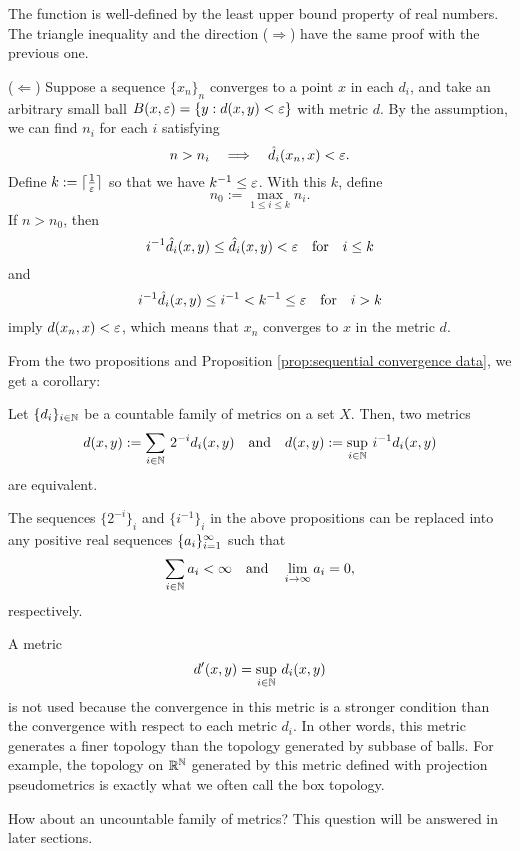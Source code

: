 \begin{pf}
The function is well-defined by the least upper bound property of real numbers.
The triangle inequality and the direction ($\Rightarrow$) have the same proof with the previous one.

($\Leftarrow$)
Suppose a sequence $\{x_n\}_n$ converges to a point $x$ in each $d_i$, and take an arbitrary small ball $B(x,\varepsilon)=\{y:d(x,y)<\varepsilon\}$ with metric $d$.
By the assumption, we can find $n_i$ for each $i$ satisfying
\[n>n_i\impl\hat d_i(x_n,x)<\e.\]
Define $k:=\lceil\frac1{\varepsilon}\rceil$ so that we have $k^{-1}\le\varepsilon$.
With this $k$, define
\[n_0:=\max_{1\le i\le k}n_i.\]
If $n>n_0$, then
\[i^{-1}\hat d_i(x,y)\le\hat d_i(x,y)<\varepsilon\quad\text{for}\quad i\le k\]
and
\[i^{-1}\hat d_i(x,y)\le i^{-1}<k^{-1}\le\varepsilon\quad\text{for}\quad i>k\]
imply $d(x_n,x)<\varepsilon$, which means that $x_n$ converges to $x$ in the metric $d$.
\end{pf}

From the two propositions and Proposition \ref{prop:sequential convergence data}, we get a corollary:
\begin{cor}
Let $\{d_i\}_{i\in\mathbb{N}}$ be a countable family of metrics on a set $X$.
Then, two metrics
\[d(x,y):=\sum_{i\in\mathbb{N}}\,2^{-i}d_i(x,y)\quad\text{and}\quad d(x,y):=\sup_{i\in\mathbb{N}}\,i^{-1}d_i(x,y)\]
are equivalent.
\end{cor}

The sequences $\{2^{-i}\}_i$ and $\{i^{-1}\}_i$ in the above propositions can be replaced into any positive real sequences $\{a_i\}_{i=1}^\infty$ such that
\[\sum_{i\in\N}a_i<\oo\quad\text{and}\quad\lim_{i\to\oo}a_i=0,\]
respectively.
\begin{rmk}
A metric
\[d'(x,y)=\sup_{i\in\mathbb{N}}\,d_i(x,y)\]
is not used because the convergence in this metric is a stronger condition than the convergence with respect to each metric $d_i$.
In other words, this metric generates a finer topology than the topology generated by subbase of balls.
For example, the topology on $\mathbb{R}^{\mathbb{N}}$ generated by this metric defined with projection pseudometrics is exactly what we often call the box topology.
\end{rmk}

How about an uncountable family of metrics?
This question will be answered in later sections.


